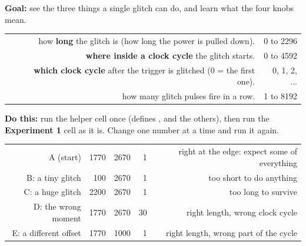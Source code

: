 \documentclass[11pt,letterpaper]{article}
\begin{document}

\textbf{Goal:} see the three things a single glitch can do, and learn what the four knobs mean.

{\small{}
\begin{longtable}{|R{0.1594}|R{0.5217}|R{0.3188}|}
\hline
{} &  &  \\ \hline
\endhead
{} & how \textbf{long} the glitch is (how long the power is pulled down). & 0 to 2296 \\ \hline
{} & \textbf{where inside a clock cycle} the glitch starts. & 0 to 4592 \\ \hline
{} & \textbf{which clock cycle} after the trigger is glitched (0 = the first one). & 0, 1, 2, ... \\ \hline
{} & how many glitch pulses fire in a row. & 1 to 8192 \\ \hline
\end{longtable}}

\vspace{4pt}

\textbf{Do this:} run the helper cell once (defines ,  and the others), then run
the \textbf{Experiment 1} cell as it is. Change one number at a time and run it again.

{\small{}
\begin{longtable}{|R{0.1812}|R{0.1014}|R{0.1014}|R{0.1014}|R{0.5145}|}
\hline
{} &  &  &  &  \\ \hline
\endhead
A (start) & 1770 & 2670 & 1 & right at the edge: expect some of everything \\ \hline
B: a tiny glitch & 100 & 2670 & 1 & too short to do anything \\ \hline
C: a huge glitch & 2200 & 2670 & 1 & too long to survive \\ \hline
D: the wrong moment & 1770 & 2670 & 30 & right length, wrong clock cycle \\ \hline
E: a different offset & 1770 & 1000 & 1 & right length, wrong part of the cycle \\ \hline
\end{longtable}}
\end{document}
